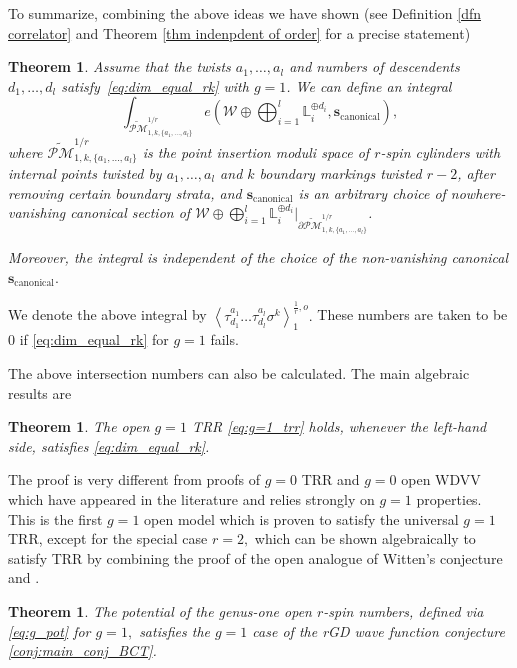 \documentclass[11pt]{amsart}
\newtheorem{thm}[dummy]{Theorem}
\theoremstyle{definition}
\theoremstyle{remark}
\newcommand{\<}{\left<}
\renewcommand{\>}{\right>}
\numberwithin{equation}{section}
\begin{document}
To summarize, combining the above ideas we have shown (see Definition \ref{dfn correlator} and Theorem \ref{thm indenpdent of order} for a precise statement)
\begin{thm}\label{thm:int_nums_well_def}
Assume that the twists $a_1,\ldots,a_l$ and numbers of descendents $d_1,\ldots,d_l$ satisfy~\eqref{eq:dim_equal_rk} with $g=1$. We can define an integral
\[\int_{\widetilde{\mathcal{PM}}^{1/r}_{1,k,\{a_1, \ldots, a_l\}}} e\left( \mathcal{W} \oplus \bigoplus_{i=1}^l \mathbb{L}_i^{\oplus d_i}, \mathbf{s}_{\text{canonical}}\right),
\]
where ${\widetilde{\mathcal{PM}}^{1/r}_{1,k,\{a_1, \ldots, a_l\}}}$ is the point insertion moduli space of $r$-spin cylinders with internal points twisted by $a_1,\ldots,a_l$ and $k$ boundary markings twisted $r-2$, after removing certain boundary strata, and $\mathbf{s}_{\text{canonical}}$ is an arbitrary choice of nowhere-vanishing canonical section of $\mathcal{W} \oplus \bigoplus_{i=1}^l\mathbb{L}_i^{\oplus d_i}|_{\partial{\widetilde{\mathcal{PM}}^{1/r}_{1,k,\{a_1, \ldots, a_l\}}}}$.

Moreover, the integral is independent of the choice of the non-vanishing canonical $\mathbf{s}_{\text{canonical}}.$ 
\end{thm}
We denote the above integral by $\left\langle\tau_{d_1}^{a_1}\ldots\tau^{a_l}_{d_l}\sigma^k\right\rangle^{\frac{1}{r},o}_1.$
These numbers are taken to be $0$ if \eqref{eq:dim_equal_rk} for $g=1$ fails.

The above intersection numbers can also be calculated. The main algebraic results are
\begin{thm}\label{thm:trr_g1}
The open $g=1$ TRR \eqref{eq:g=1_trr} holds, whenever the left-hand side, satisfies \eqref{eq:dim_equal_rk}.
\end{thm}
The proof is very different from proofs of $g=0$ TRR and $g=0$ open WDVV which have appeared in the literature \cite{PST14,BCT2,TZ2,solomon2023relative} and relies strongly on $g=1$ properties.
This is the first $g=1$ open model which is proven to satisfy the universal $g=1$ TRR, except for the special case $r=2,$ which can be shown algebraically to satisfy TRR by combining the proof of the open analogue of Witten's conjecture \cite{BT17} and \cite[Theorem 1]{BCT3}.
\begin{thm}\label{thm:wave_func}
    The potential of the genus-one open $r$-spin numbers, defined via \eqref{eq:g_pot} for $g=1,$ satisfies the $g=1$ case of the rGD wave function conjecture \ref{conj:main_conj_BCT}.
\end{thm}
\end{document}

